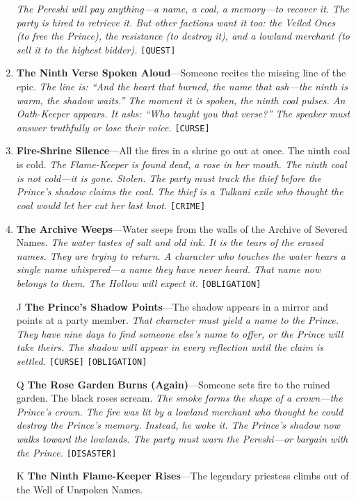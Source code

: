 \begin{enumerate}
  \hfill \textit{The Pereshi will pay anything---a name, a coal, a memory---to recover it. The party is hired to retrieve it. But other factions want it too: the Veiled Ones (to free the Prince), the resistance (to destroy it), and a lowland merchant (to sell it to the highest bidder).} \texttt{[QUEST]}
\item \textbf{The Ninth Verse Spoken Aloud}---Someone recites the missing line of the epic.
  \hfill \textit{The line is: ``And the heart that burned, the name that ash---the ninth is warm, the shadow waits.'' The moment it is spoken, the ninth coal pulses. An Oath-Keeper appears. It asks: ``Who taught you that verse?'' The speaker must answer truthfully or lose their voice.} \texttt{[CURSE]}
\item \textbf{Fire-Shrine Silence}---All the fires in a shrine go out at once. The ninth coal is cold.
  \hfill \textit{The Flame-Keeper is found dead, a rose in her mouth. The ninth coal is not cold---it is gone. Stolen. The party must track the thief before the Prince's shadow claims the coal. The thief is a Tulkani exile who thought the coal would let her cut her last knot.} \texttt{[CRIME]}
\item \textbf{The Archive Weeps}---Water seeps from the walls of the Archive of Severed Names.
  \hfill \textit{The water tastes of salt and old ink. It is the tears of the erased names. They are trying to return. A character who touches the water hears a single name whispered---a name they have never heard. That name now belongs to them. The Hollow will expect it.} \texttt{[OBLIGATION]}
\item[J] \textbf{The Prince's Shadow Points}---The shadow appears in a mirror and points at a party member.
  \hfill \textit{That character must yield a name to the Prince. They have nine days to find someone else's name to offer, or the Prince will take theirs. The shadow will appear in every reflection until the claim is settled.} \texttt{[CURSE]} \texttt{[OBLIGATION]}
\item[Q] \textbf{The Rose Garden Burns (Again)}---Someone sets fire to the ruined garden. The black roses scream.
  \hfill \textit{The smoke forms the shape of a crown---the Prince's crown. The fire was lit by a lowland merchant who thought he could destroy the Prince's memory. Instead, he woke it. The Prince's shadow now walks toward the lowlands. The party must warn the Pereshi---or bargain with the Prince.} \texttt{[DISASTER]}
\item[K] \textbf{The Ninth Flame-Keeper Rises}---The legendary priestess climbs out of the Well of Unspoken Names.

\end{enumerate}
